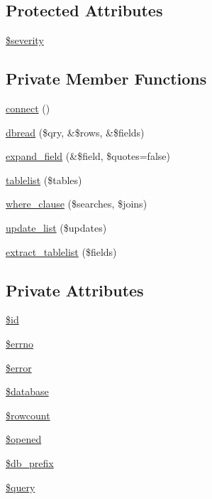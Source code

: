 \subsection*{Protected Attributes}
\begin{DoxyCompactItemize}
\item 
\hyperlink{class__OWL_ad26b40a9dbbacb33e299b17826f8327c}{\$severity}
\end{DoxyCompactItemize}
\subsection*{Private Member Functions}
\begin{DoxyCompactItemize}
\item 
\hyperlink{classDbHandler_a9cf52ba614981a0082063d57290d3b7c}{connect} ()
\item 
\hyperlink{classDbHandler_a130e49aa639fecb46ce6719ddcb0d72f}{dbread} (\$qry, \&\$rows, \&\$fields)
\item 
\hyperlink{classDbHandler_a7896419cf143412ad74ca8fccb11fb6e}{expand\_\-field} (\&\$field, \$quotes=false)
\item 
\hyperlink{classDbHandler_a2b6376ab821eb4aa2f086d852099c6c1}{tablelist} (\$tables)
\item 
\hyperlink{classDbHandler_a7715991ea990f6610a95844bebd75800}{where\_\-clause} (\$searches, \$joins)
\item 
\hyperlink{classDbHandler_aa734a4d3767057b811be5b4621d55cdd}{update\_\-list} (\$updates)
\item 
\hyperlink{classDbHandler_af7a315d2a47dc9f2d2f897ca87981c00}{extract\_\-tablelist} (\$fields)
\end{DoxyCompactItemize}
\subsection*{Private Attributes}
\begin{DoxyCompactItemize}
\item 
\hyperlink{classDbHandler_ad38e1c3312815c8ad4093957881092ff}{\$id}
\item 
\hyperlink{classDbHandler_af6e9f493be56617cb533763bb2a0e85a}{\$errno}
\item 
\hyperlink{classDbHandler_ade79e11156abbfc180864beb5b9df377}{\$error}
\item 
\hyperlink{classDbHandler_afaac5248f9ee59786b48a7b51f318940}{\$database}
\item 
\hyperlink{classDbHandler_a56a7ae4bd7d842c85f3fe8052aecbfef}{\$rowcount}
\item 
\hyperlink{classDbHandler_a71e36ffbff0d157b1d91dc000bc6f821}{\$opened}
\item 
\hyperlink{classDbHandler_a19af96598e7f72673fc5da26ad77731b}{\$db\_\-prefix}
\item 
\hyperlink{classDbHandler_ad671b5596b37dac6d48a660a07775965}{\$query}
\end{DoxyCompactItemize}
